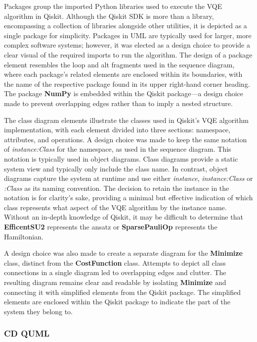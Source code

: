 \documentclass{article}
\begin{document}
Packages group the imported Python libraries used to execute the VQE algorithm in Qiskit. Although the Qiskit SDK is more than a library, encompassing a collection of libraries alongside other utilities\cite{SheriefAbul-Ezz}, it is depicted as a single package for simplicity. Packages in UML are typically used for larger, more complex software systems\cite{VisualParadigm}; however, it was elected as a design choice to provide a clear visual of the required imports to run the algorithm. The design of a package element resembles the loop and alt fragments used in the sequence diagram, where each package's related elements are enclosed within its boundaries, with the name of the respective package found in its upper right-hand corner heading. The package \textbf{NumPy} is embedded within the Qiskit package—a design choice made to prevent overlapping edges rather than to imply a nested structure.

The class diagram elements illustrate the classes used in Qiskit’s VQE algorithm implementation, with each element divided into three sections: namespace, attributes, and operations. A design choice was made to keep the same notation of \textit{instance:Class} for the namespace, as used in the sequence diagram. This notation is typically used in object diagrams. Class diagrams provide a static system view and typically only include the class name. In contrast, object diagrams capture the system at runtime and use either \textit{instance}, \textit{instance:Class} or \textit{:Class} as its naming convention\cite{Seidl_Scholz_Huemer_Kappel_Duffy_2014}. The decision to retain the instance in the notation is for clarity's sake, providing a minimal but effective indication of which class represents what aspect of the VQE algorithm by the instance name. Without an in-depth knowledge of Qiskit, it may be difficult to determine that \textbf{EfficentSU2} represents the ansatz or \textbf{SparsePauliOp} represents the Hamiltonian.

A design choice was also made to create a separate diagram for the \textbf{Minimize} class, distinct from the \textbf{CostFunction} class. Attempts to depict all class connections in a single diagram led to overlapping edges and clutter. The resulting diagram remains clear and readable by isolating \textbf{Minimize} and connecting it with simplified elements from the Qiskit package. The simplified elements are enclosed within the Qiskit package to indicate the part of the system they belong to.

\subsubsection{CD QUML}
\end{document}
